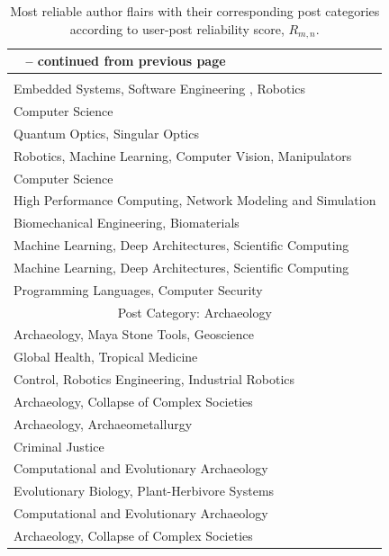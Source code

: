 \begin{spacing}{1}
\begin{longtable}{l}
\caption[Author flairs per post categories]{Most reliable author flairs with their corresponding post categories according to user-post reliability score, $R_{m, n}$.
} \\
\hline  \toprule
\endfirsthead

\hline
{\bfseries \tablename\ \thetable{} -- continued from previous page} \\ \hline
\endhead

\hline %
\endfoot

\endlastfoot
 \multicolumn{1}{c}{Post Category: Computing} \\ \hline
Embedded Systems, Software Engineering , Robotics \\
Computer Science \\
Quantum Optics, Singular Optics \\
Robotics, Machine Learning, Computer Vision, Manipulators \\
Computer Science \\
High Performance Computing, Network Modeling and Simulation \\
Biomechanical Engineering, Biomaterials \\
Machine Learning, Deep Architectures, Scientific Computing  \\
Machine Learning, Deep Architectures, Scientific Computing\\
Programming Languages, Computer Security \\
\hline

\multicolumn{1}{c}{Post Category: Archaeology} \\ \hline
Archaeology, Maya Stone Tools, Geoscience \\
Global Health, Tropical Medicine \\
Control, Robotics Engineering, Industrial Robotics \\
Archaeology, Collapse of Complex Societies \\
Archaeology, Archaeometallurgy \\
Criminal Justice  \\
Computational and Evolutionary Archaeology \\
Evolutionary Biology, Plant-Herbivore Systems \\
Computational and Evolutionary Archaeology \\
Archaeology, Collapse of Complex Societies \\
\hline


\end{longtable}
\end{spacing}
